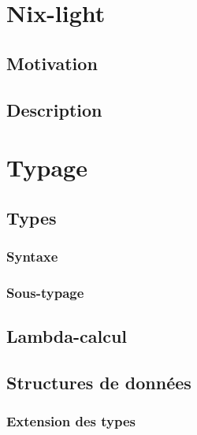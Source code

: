 \documentclass[frenchb]{scrartcl}
\begin{document}
\section{Nix-light} %

\subsection{Motivation}

\subsection{Description}

\section{Typage}

\subsection{Types}

\subsubsection{Syntaxe}
\subsubsection{Sous-typage}

\subsection{Lambda-calcul}

\subsection{Structures de données}

\subsubsection{Extension des types}
\end{document}
